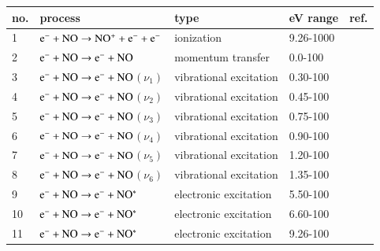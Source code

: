 \begin{table}[!htbp]
  \center{}
  \begin{threeparttable}
    \label{tab:tableNO}
    \begin{tabular*}{\textwidth}{l@{\extracolsep{\fill}}llll}
    \toprule
    {no.}  & {process} & {type} &  {eV range}  &  {ref.} \\
    \midrule
      1 & $\rm e^- + NO \rightarrow NO^+ + e^- + e^-$  &  ionization   &  9.26-1000 &   \cite{lxc:2024:morgan} \\ 
      \midrule     
      2 & $\rm e^- + NO \rightarrow e^- + NO$  &  momentum transfer   &  0.0-100  & \cite{lxc:2024:morgan}\\   
      \midrule
      3 & $\rm e^- + NO \rightarrow e^- + NO$$(\nu_1) $  &  vibrational excitation   &  0.30-100 & \cite{lxc:2024:morgan}\\ 
      4 & $\rm e^- + NO \rightarrow e^- + NO$$(\nu_2) $  &  vibrational excitation   &  0.45-100 & \cite{lxc:2024:morgan}\\ 
      5 & $\rm e^- + NO \rightarrow e^- + NO$$(\nu_3) $  &  vibrational excitation   &  0.75-100 & \cite{lxc:2024:morgan}\\ 
      6 & $\rm e^- + NO \rightarrow e^- + NO$$(\nu_4) $  &  vibrational excitation   &  0.90-100 & \cite{lxc:2024:morgan}\\ 
      7 & $\rm e^- + NO \rightarrow e^- + NO$$(\nu_5) $  &  vibrational excitation   &  1.20-100 & \cite{lxc:2024:morgan}\\ 
      8 & $\rm e^- + NO \rightarrow e^- + NO$$(\nu_6) $  &  vibrational excitation   &  1.35-100 & \cite{lxc:2024:morgan}\\ 
     \midrule
      9 & $\rm e^- + NO \rightarrow e^- + NO^* $  &  electronic excitation   &  5.50-100 & \cite{lxc:2024:morgan}\\ 
     10 & $\rm e^- + NO \rightarrow e^- + NO^* $  &  electronic excitation   &  6.60-100 & \cite{lxc:2024:morgan}\\
     11 & $\rm e^- + NO \rightarrow e^- + NO^* $  &  electronic excitation   &  9.26-100 & \cite{lxc:2024:morgan}\\
    \bottomrule
    \end{tabular*}
   \end{threeparttable}
\end{table}

